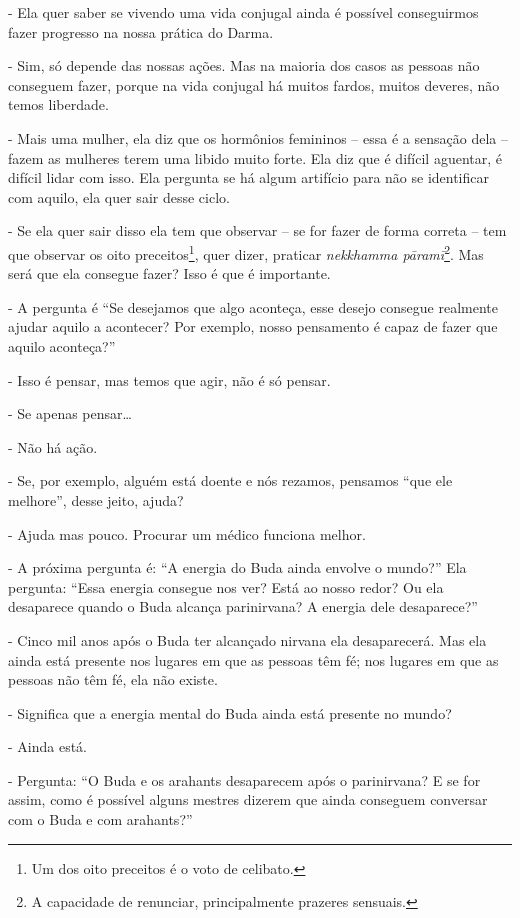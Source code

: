 - Ela quer saber se vivendo uma vida conjugal ainda é possível
conseguirmos fazer progresso na nossa prática do Darma.

- Sim, só depende das nossas ações. Mas na maioria dos casos as
pessoas não conseguem fazer, porque na vida conjugal há muitos fardos,
muitos deveres, não temos liberdade.

- Mais uma mulher, ela diz que os hormônios femininos – essa é a
sensação dela – fazem as mulheres terem uma libido muito forte. Ela diz
que é difícil aguentar, é difícil lidar com isso. Ela pergunta se há
algum artifício para não se identificar com aquilo, ela quer sair desse
ciclo.

- Se ela quer sair disso ela tem que observar – se for fazer de
forma correta – tem que observar os oito preceitos\footnote{Um dos oito
preceitos é o voto de celibato.}, quer dizer, praticar
\textit{nekkhamma p\=aramī}\footnote{A capacidade de renunciar,
principalmente prazeres sensuais.}. Mas será que ela consegue fazer?
Isso é que é importante.

- A pergunta é “Se desejamos que algo aconteça, esse desejo
consegue realmente ajudar aquilo a acontecer? Por exemplo, nosso
pensamento é capaz de fazer que aquilo aconteça?”

- Isso é pensar, mas temos que agir, não é só pensar.

- Se apenas pensar…

- Não há ação.

- Se, por exemplo, alguém está doente e nós rezamos, pensamos “que
ele melhore”, desse jeito, ajuda?

- Ajuda mas pouco. Procurar um médico funciona melhor.

- A próxima pergunta é: “A energia do Buda ainda envolve o mundo?”
Ela pergunta: “Essa energia consegue nos ver? Está ao nosso redor? Ou
ela desaparece quando o Buda alcança parinirvana? A energia dele
desaparece?”

- Cinco mil anos após o Buda ter alcançado nirvana ela
desaparecerá. Mas ela ainda está presente nos lugares em que as pessoas
têm fé; nos lugares em que as pessoas não têm fé, ela não existe.

- Significa que a energia mental do Buda ainda está presente no
mundo?

- Ainda está.

- Pergunta: “O Buda e os arahants desaparecem após o parinirvana?
E se for assim, como é possível alguns mestres dizerem que ainda
conseguem conversar com o Buda e com arahants?”

